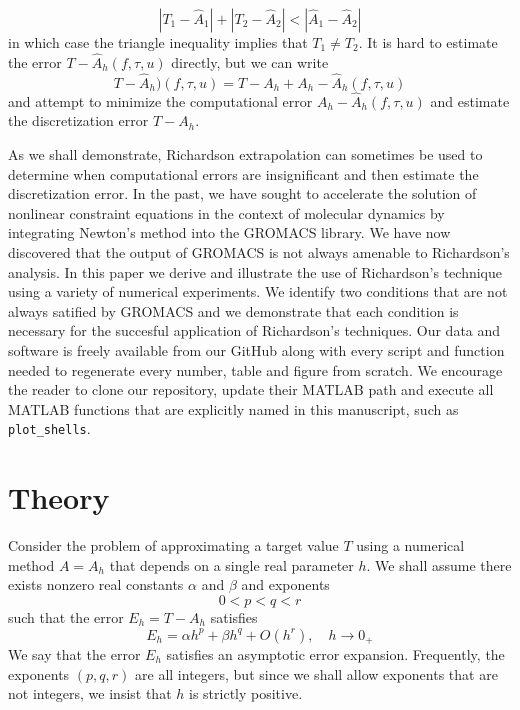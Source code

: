 \documentclass[runningheads]{llncs}
\begin{document}
\begin{equation}
  | T_1 - \hat{A}_1| + |T_2 - \hat{A}_2| < |\hat{A}_1 - \hat{A}_2|
\end{equation}
in which case the triangle inequality implies that $T_1 \not = T_2$. 
It is hard to estimate the error $T - \hat{A}_h(f, \tau, u)$ directly, but we can write
\begin{equation}
  T - \hat{A}_h)(f, \tau, u) = T - A_h + A_h - \hat{A}_h(f, \tau, u)
\end{equation}
and attempt to minimize the computational error $A_h - \hat{A}_h(f, \tau, u)$ and estimate the discretization error $T - A_h$. 

As we shall demonstrate, Richardson extrapolation \cite{richardson1927} can sometimes be used to determine when computational errors are insignificant and then estimate the discretization error.
In the past, we have sought to accelerate the solution of nonlinear constraint equations in the context of molecular dynamics by integrating Newton's method into the GROMACS library. 
We have now discovered that the output of GROMACS is not always amenable to Richardson's analysis.
In this paper we derive and illustrate the use of Richardson's technique using a variety of numerical experiments.
We identify two conditions that are not always satified by GROMACS and we demonstrate that each condition is necessary for the succesful application of Richardson's techniques.
Our data and software is freely available from our GitHub along with every script and function needed to regenerate every number, table and figure from scratch. We encourage the reader to clone our repository, update their MATLAB path and execute all MATLAB functions that are explicitly named in this manuscript, such as {\tt plot\_shells}.


\section{Theory}

Consider the problem of approximating a target value $T$ using a numerical method $A = A_h$ that depends on a single real parameter $h$. We shall assume there exists nonzero real constants $\alpha$ and $\beta$ and exponents
\begin{equation}
  0 < p < q < r
\end{equation}
such that the error $E_h = T - A_h$ satisfies
\begin{equation} \label{equ:aex}
  E_h  = \alpha h^p + \beta h^q + O(h^r), \quad h \rightarrow 0_+
\end{equation}
We say that the error $E_h$ satisfies an asymptotic error expansion. Frequently, the exponents $(p,q,r)$ are all integers, but since we shall allow exponents that are not integers, we insist that $h$ is strictly positive.
\end{document}
